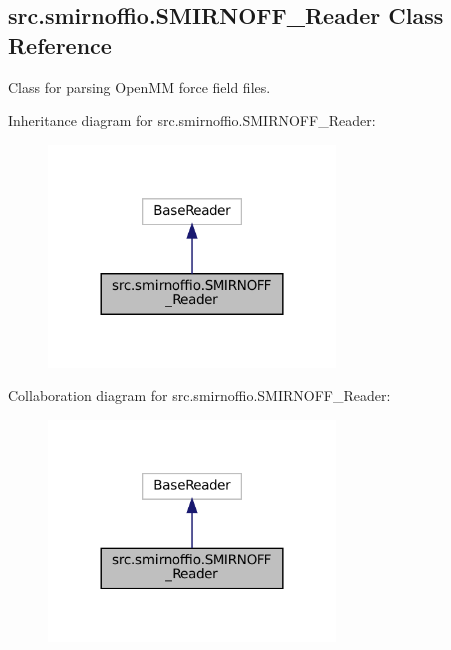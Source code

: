 \hypertarget{classsrc_1_1smirnoffio_1_1SMIRNOFF__Reader}{}\subsection{src.\+smirnoffio.\+S\+M\+I\+R\+N\+O\+F\+F\+\_\+\+Reader Class Reference}
\label{classsrc_1_1smirnoffio_1_1SMIRNOFF__Reader}


Class for parsing Open\+MM force field files.  




Inheritance diagram for src.\+smirnoffio.\+S\+M\+I\+R\+N\+O\+F\+F\+\_\+\+Reader\+:
\nopagebreak
\begin{figure}[H]
\begin{center}
\leavevmode
\includegraphics[width=216pt]{classsrc_1_1smirnoffio_1_1SMIRNOFF__Reader__inherit__graph}
\end{center}
\end{figure}


Collaboration diagram for src.\+smirnoffio.\+S\+M\+I\+R\+N\+O\+F\+F\+\_\+\+Reader\+:
\nopagebreak
\begin{figure}[H]
\begin{center}
\leavevmode
\includegraphics[width=216pt]{classsrc_1_1smirnoffio_1_1SMIRNOFF__Reader__coll__graph}
\end{center}
\end{figure}
